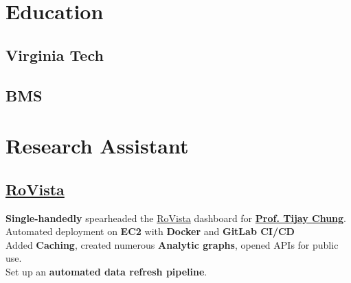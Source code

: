 \documentclass[]{resume-openfont}
\begin{document}
\begin{minipage}[t]{0.33\textwidth}


\section{Education}

\subsection{Virginia Tech}
\sectionsep

\subsection{BMS}
\sectionsep


\section{Research Assistant}
\subsection{\href{https://rovista.netsecurelab.org/}{RoVista}}

\textbullet{} \textbf{Single-handedly} spearheaded the \href{https://rovista.netsecurelab.org/}{RoVista} dashboard for \href{mailto:tijay@vt.edu}{\textbf{Prof. Tijay Chung}}. \\
\textbullet{} Automated deployment on \textbf{EC2} with \textbf{Docker} and \textbf{GitLab CI/CD} \\
\textbullet{} Added \textbf{Caching}, created numerous \textbf{Analytic graphs}, opened APIs for public use. \\
\textbullet{} Set up an \textbf{automated data refresh pipeline}.

\sectionsep


\end{minipage}
\end{document}
